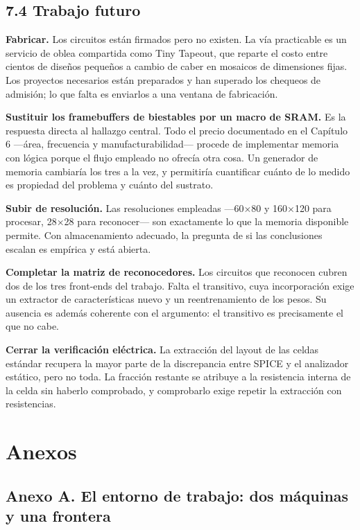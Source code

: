 \section{7.4 Trabajo futuro}\label{trabajo-futuro}

\textbf{Fabricar.} Los circuitos están firmados pero no existen. La vía
practicable es un servicio de oblea compartida como Tiny Tapeout, que
reparte el costo entre cientos de diseños pequeños a cambio de caber en
mosaicos de dimensiones fijas. Los proyectos necesarios están preparados
y han superado los chequeos de admisión; lo que falta es enviarlos a una
ventana de fabricación.

\textbf{Sustituir los framebuffers de biestables por un macro de SRAM.}
Es la respuesta directa al hallazgo central. Todo el precio documentado
en el Capítulo 6 ---área, frecuencia y manufacturabilidad--- procede de
implementar memoria con lógica porque el flujo empleado no ofrecía otra
cosa. Un generador de memoria cambiaría los tres a la vez, y permitiría
cuantificar cuánto de lo medido es propiedad del problema y cuánto del
sustrato.

\textbf{Subir de resolución.} Las resoluciones empleadas ---60×80 y
160×120 para procesar, 28×28 para reconocer--- son exactamente lo que la
memoria disponible permite. Con almacenamiento adecuado, la pregunta de
si las conclusiones escalan es empírica y está abierta.

\textbf{Completar la matriz de reconocedores.} Los circuitos que
reconocen cubren dos de los tres front-ends del trabajo. Falta el
transitivo, cuya incorporación exige un extractor de características
nuevo y un reentrenamiento de los pesos. Su ausencia es además coherente
con el argumento: el transitivo es precisamente el que no cabe.

\textbf{Cerrar la verificación eléctrica.} La extracción del layout de
las celdas estándar recupera la mayor parte de la discrepancia entre
SPICE y el analizador estático, pero no toda. La fracción restante se
atribuye a la resistencia interna de la celda sin haberlo comprobado, y
comprobarlo exige repetir la extracción con resistencias.

\newpage

\chapter{Anexos}\label{anexos}

\section{Anexo A. El entorno de trabajo: dos máquinas y una
frontera}\label{anexo-a.-el-entorno-de-trabajo-dos-muxe1quinas-y-una-frontera}


